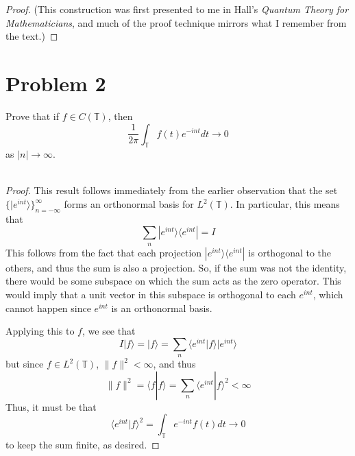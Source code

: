 \documentclass[fontsize=11pt]{scrartcl} %
\numberwithin{equation}{section} %
\numberwithin{figure}{section} %
\numberwithin{table}{section} %
\newcommand{\la}{\langle}
\newcommand{\ra}{\rangle}
\begin{document}
\begin{proof}
    (This construction was first presented to me in Hall's {\em Quantum Theory
        for Mathematicians}, and much of the proof technique mirrors what I
    remember from the text.)
\end{proof}

\newpage

\section*{Problem 2}
Prove that if $f\in C(\mathbb{T})$, then
\[
    \frac{1}{2\pi}\int_{\mathbb{T}}f(t)e^{-int}dt \to 0
\]
as $|n|\to \infty$.
\\
\\
\begin{proof}
    This result follows immediately from the earlier observation that the set
    $\{|e^{int}\ra\}_{n=-\infty}^{\infty}$ forms an orthonormal basis for
    $L^2(\mathbb{T})$. In particular, this means that
    \[
        \sum_n |e^{int}\ra\la e^{int}| = I
    \]
    This follows from the fact that each projection $|e^{int}\ra\la e^{int}|$ is
    orthogonal to the others, and thus the sum is also a projection. So, if the
    sum was not the identity, there would be some subspace on which the sum acts
    as the zero operator. This would imply that a unit vector in this subspace
    is orthogonal to each $e^{int}$, which cannot happen since $e^{int}$ is an
    orthonormal basis.

    Applying this to $f$, we see that
    \[
        I|f\ra = |f\ra = \sum_n \la e^{int}|f\ra|e^{int}\ra
    \]
    but since $f\in L^2(\mathbb{T})$, $\|f\|^2 < \infty$, and thus
    \[
        \|f\|^2 = \la f|f\ra = \sum_n \la e^{int}|f\ra^2 < \infty
    \]
    Thus, it must be that
    \[
        \la e^{int}|f\ra^2 = \int_{\mathbb{T}}e^{-int}f(t)dt \to 0
    \]
    to keep the sum finite, as desired.
\end{proof}

\newpage
\end{document}
